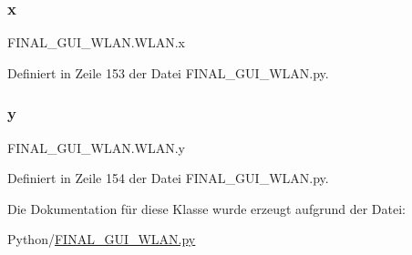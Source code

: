 \subsubsection{\texorpdfstring{x}{x}}
{\footnotesize\ttfamily F\+I\+N\+A\+L\+\_\+\+G\+U\+I\+\_\+\+W\+L\+A\+N.\+W\+L\+A\+N.\+x\hspace{0.3cm}{\ttfamily [static]}}



Definiert in Zeile 153 der Datei F\+I\+N\+A\+L\+\_\+\+G\+U\+I\+\_\+\+W\+L\+A\+N.\+py.

\mbox{\label{class_f_i_n_a_l___g_u_i___w_l_a_n_1_1_w_l_a_n_a6104642e833ec3c75685f2632fc9de90}} 
\subsubsection{\texorpdfstring{y}{y}}
{\footnotesize\ttfamily F\+I\+N\+A\+L\+\_\+\+G\+U\+I\+\_\+\+W\+L\+A\+N.\+W\+L\+A\+N.\+y\hspace{0.3cm}{\ttfamily [static]}}



Definiert in Zeile 154 der Datei F\+I\+N\+A\+L\+\_\+\+G\+U\+I\+\_\+\+W\+L\+A\+N.\+py.



Die Dokumentation für diese Klasse wurde erzeugt aufgrund der Datei\+:\begin{DoxyCompactItemize}
\item 
Python/\hyperlink{_f_i_n_a_l___g_u_i___w_l_a_n_8py}{F\+I\+N\+A\+L\+\_\+\+G\+U\+I\+\_\+\+W\+L\+A\+N.\+py}\end{DoxyCompactItemize}
